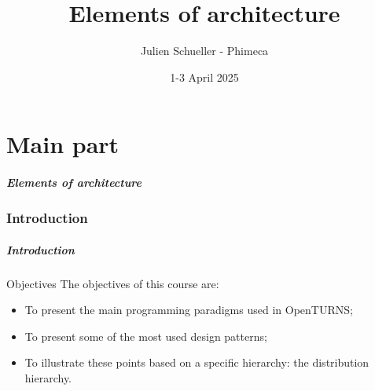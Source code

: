 \documentclass[8pt]{beamer}
\title{Elements of architecture}
\author{Julien Schueller - Phimeca}
\date{1-3 April 2025}
\institute{\small OpenTURNS Consortium}
\begin{document}
\frame{\titlepage}

\part{Main part}

\begin{frame}
  \Large
  \frametitle{Elements of architecture}
  \tableofcontents[part=1]
\end{frame}
\section[]{Introduction}
\begin{frame}
  \frametitle{Introduction}
  \begin{block}{Objectives}
    The objectives of this course are:
    \begin{itemize}
    \item To present the main programming paradigms used in OpenTURNS;
    \item To present some of the most used design patterns;
    \item To illustrate these points based on a specific hierarchy: the distribution hierarchy.
    \end{itemize}
  \end{block}
\end{frame}
\end{document}
